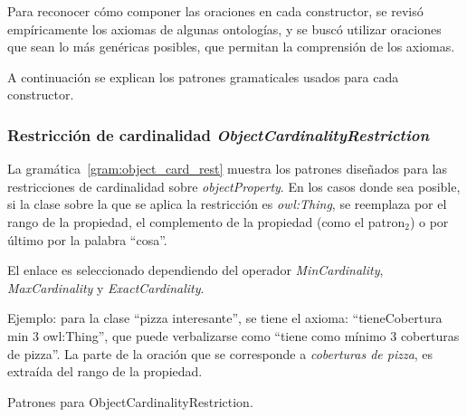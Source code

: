 Para reconocer cómo componer las oraciones en cada constructor, se revisó empíricamente los axiomas de algunas ontologías, y se buscó utilizar oraciones que sean lo más genéricas posibles, que permitan la comprensión de los axiomas. 

A continuación se explican los patrones gramaticales usados para cada constructor. %

\subsubsection{Restricción de cardinalidad \emph{ObjectCardinalityRestriction}}

La gramática~\ref{gram:object_card_rest} muestra los patrones diseñados para las restricciones de cardinalidad sobre \emph{objectProperty}. En los casos donde sea posible, si la clase sobre la que se aplica la restricción es \emph{owl:Thing}, se reemplaza por el rango de la propiedad, el complemento de la propiedad (como el patron$_2$) o por último por la palabra ``cosa''.

El enlace es seleccionado dependiendo del operador \emph{MinCardinality}, \emph{MaxCardinality} y \emph{ExactCardinality}.

Ejemplo: para la clase ``pizza interesante'', se tiene el axioma: ``tieneCobertura min 3 owl:Thing'', que puede verbalizarse como ``tiene como mínimo 3 coberturas de pizza''. La parte de la oración que se corresponde a \emph{coberturas de pizza}, es extraída del rango de la propiedad.

\begin{GrammarEnv}
\begin{grammar}
\end{grammar}
\caption{Patrones para ObjectCardinalityRestriction.}\label{gram:object_card_rest}
\end{GrammarEnv}

